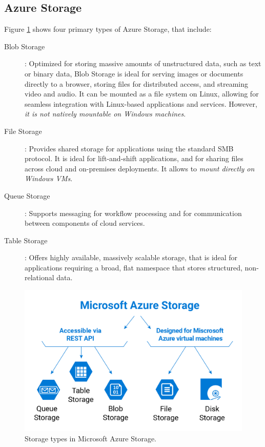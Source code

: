 \documentclass{article}
\begin{document}
\subsection{Azure Storage}

Figure \ref{fig:azstorage} shows four primary types of Azure Storage, that include:

\begin{description}
\item[Blob Storage]: Optimized for storing massive amounts of unstructured data, such as text or binary data, Blob Storage is ideal for serving images or documents directly to a browser, storing files for distributed access, and streaming video and audio. It can be mounted as a file system on Linux, allowing for seamless integration with Linux-based applications and services. However, \textit{it is not natively mountable on Windows machines}.

\item[File Storage]: Provides shared storage for applications using the standard SMB protocol. It is ideal for lift-and-shift applications, and for sharing files across cloud and on-premises deployments. It allows to \textit{mount directly on Windows VMs}.

\item[Queue Storage]: Supports messaging for workflow processing and for communication between components of cloud services.

\item[Table Storage]: Offers highly available, massively scalable storage, that is ideal for applications requiring a broad, flat namespace that stores structured, non-relational data.
\end{description}


\begin{figure}[H]
\begin{center}
\includegraphics[scale = .25]{figures/storage_types.png}
\caption{Storage types in Microsoft Azure Storage.}
\label{fig:azstorage}
\end{center}
\end{figure}
\end{document}
